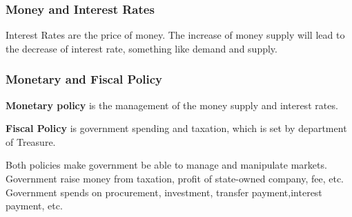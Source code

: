 \documentclass[10pt, a4paper]{article}
\begin{document}
            \subsubsection{Money and Interest Rates}
                Interest Rates are the price of money. The increase of money supply will lead to the decrease of interest rate, something like demand and supply.
            \subsubsection{Monetary and Fiscal Policy}
                \textbf{Monetary policy} is the management of the money supply and interest rates. 

                \textbf{Fiscal Policy} is government spending and taxation, which is set by department of Treasure. 

                Both policies make government be able to manage and manipulate markets. Government raise money from taxation, profit of state-owned company, fee, etc. Government spends on procurement, investment, transfer payment,interest payment, etc. 
\end{document}

